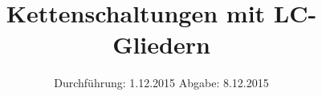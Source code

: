 

\subject{V 356}
\title{Kettenschaltungen mit LC-Gliedern}
\date{
  Durchführung: 1.12.2015
  \hspace{3em}
  Abgabe: 8.12.2015
}



\maketitle
\thispagestyle{empty}
\tableofcontents
\newpage







\printbibliography


